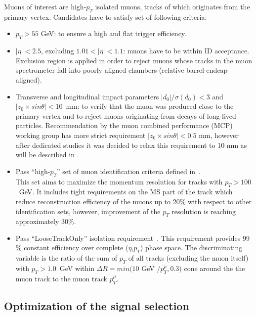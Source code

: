 Muons of interest are high-$p_T$ isolated muons, tracks of which originates
from the primary vertex. Candidates have to satisfy set of following criteria:
\begin{itemize}
 \item $p_T > 55$ GeV: to ensure a high and flat trigger efficiency.
 \item $|\eta|<2.5$, excluding $1.01 < |\eta| < 1.1$: muons have to be within ID acceptance. 
 Exclusion region is applied in order to reject muons whose tracks in the muon spectrometer fall into poorly aligned chambers (relative barrel-endcap aligned).
 \item Transverse and longitudinal impact parameters $|d_0|/\sigma(d_0)<3$ and $|z_0\times sin\theta|<10$~mm: 
 to verify that the muon was produced close to the primary vertex and to reject muons originating from decays of long-lived particles. Recommendation by the muon combined performance (MCP) working group has
 more strict requirement $|z_0 \times sin \theta| < 0.5$ mm, however after dedicated studies it 
 was decided to relax this requirement to 10 mm as will be described in .
 \item Pass ``high-$p_T$'' set of muon identification criteria defined in~\cite{muon_performance_2015}. \\ 
 This set aims to maximize the momentum resolution for tracks with $p_T > 100$~GeV.
 It includes tight requirements on the MS part of the track which reduce reconstruction
 efficiency of the muons up to 20$\%$ with respect to other identification sets, however, 
 improvement of the $p_T$ resolution is reaching approximately 30$\%$.
 \item Pass ``LooseTrackOnly'' isolation requirement~\cite{muon_performance_2015}. 
 This requirement provides 99$\%$ constant efficiency over complete ($\eta$,$p_T$) phase space.
 The discriminating variable is the ratio of the sum of $p_T$ of all tracks (excluding the muon itself) with $p_T > 1.0$~GeV within $\Delta R = min(10$ GeV $/p_T^{\mu}, 0.3)$ 
 cone around the the muon track to the muon track $p_T^{\mu}$.
\end{itemize}  
 
\subsection{Optimization of the signal selection}
\label{subsec:wprime_cut_optimization}

